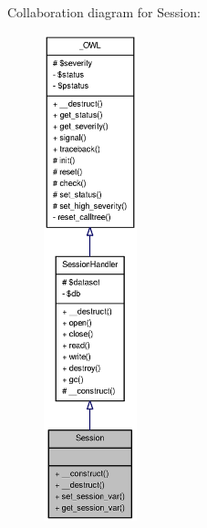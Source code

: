 Collaboration diagram for Session:\nopagebreak
\begin{figure}[H]
\begin{center}
\leavevmode
\includegraphics[height=400pt]{classSession__coll__graph}
\end{center}
\end{figure}
